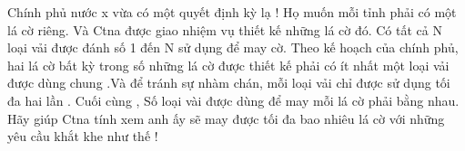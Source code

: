 Chính phủ nước x vừa có một quyết định kỳ lạ ! Họ muốn mỗi tỉnh phải có một lá cờ riêng. Và Ctna được giao nhiệm vụ thiết kế những lá cờ đó. Có tất cả N loại vải được đánh số 1 đến N sử dụng để may cờ. Theo kế hoạch của chính phủ, hai lá cờ bất kỳ trong số những lá cờ được thiết kế phải có ít nhất một loại vải được dùng chung .Và để tránh sự nhàm chán, mỗi loại vải chỉ được sử dụng tối đa hai lần . Cuối cùng , Số loại vài được dùng để may mỗi lá cờ phải bằng nhau. Hãy giúp Ctna tính xem anh ấy sẽ may được tối đa bao nhiêu lá cờ với những yêu cầu khắt khe như thế !

\